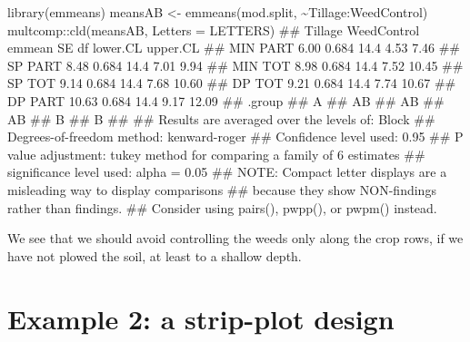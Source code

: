 \documentclass[a4paper,12pt,oneside]{book}
\newenvironment{Shaded}{\begin{snugshade}}{\end{snugshade}}
\newcommand{\SpecialCharTok}[1]{#1}
\newcommand{\DocumentationTok}[1]{#1}
\newcommand{\OtherTok}[1]{#1}
\newcommand{\FunctionTok}[1]{#1}
\newcommand{\AttributeTok}[1]{#1}
\newcommand{\AlertTok}[1]{#1}
\newcommand{\NormalTok}[1]{#1}
\begin{document}
\begin{Shaded}
\begin{Highlighting}[]
\FunctionTok{library}\NormalTok{(emmeans)}
\NormalTok{meansAB }\OtherTok{\textless{}{-}} \FunctionTok{emmeans}\NormalTok{(mod.split, }\SpecialCharTok{\textasciitilde{}}\NormalTok{Tillage}\SpecialCharTok{:}\NormalTok{WeedControl)}
\NormalTok{multcomp}\SpecialCharTok{::}\FunctionTok{cld}\NormalTok{(meansAB, }\AttributeTok{Letters =}\NormalTok{ LETTERS)}
\DocumentationTok{\#\#  Tillage WeedControl emmean    SE   df lower.CL upper.CL}
\DocumentationTok{\#\#  MIN     PART          6.00 0.684 14.4     4.53     7.46}
\DocumentationTok{\#\#  SP      PART          8.48 0.684 14.4     7.01     9.94}
\DocumentationTok{\#\#  MIN     TOT           8.98 0.684 14.4     7.52    10.45}
\DocumentationTok{\#\#  SP      TOT           9.14 0.684 14.4     7.68    10.60}
\DocumentationTok{\#\#  DP      TOT           9.21 0.684 14.4     7.74    10.67}
\DocumentationTok{\#\#  DP      PART         10.63 0.684 14.4     9.17    12.09}
\DocumentationTok{\#\#  .group}
\DocumentationTok{\#\#   A    }
\DocumentationTok{\#\#   AB   }
\DocumentationTok{\#\#   AB   }
\DocumentationTok{\#\#   AB   }
\DocumentationTok{\#\#    B   }
\DocumentationTok{\#\#    B   }
\DocumentationTok{\#\# }
\DocumentationTok{\#\# Results are averaged over the levels of: Block }
\DocumentationTok{\#\# Degrees{-}of{-}freedom method: kenward{-}roger }
\DocumentationTok{\#\# Confidence level used: 0.95 }
\DocumentationTok{\#\# P value adjustment: tukey method for comparing a family of 6 estimates }
\DocumentationTok{\#\# significance level used: alpha = 0.05 }
\DocumentationTok{\#\# }\AlertTok{NOTE}\DocumentationTok{: Compact letter displays are a misleading way to display comparisons}
\DocumentationTok{\#\#       because they show NON{-}findings rather than findings.}
\DocumentationTok{\#\#       Consider using \textquotesingle{}pairs()\textquotesingle{}, \textquotesingle{}pwpp()\textquotesingle{}, or \textquotesingle{}pwpm()\textquotesingle{} instead.}
\end{Highlighting}
\end{Shaded}

We see that we should avoid controlling the weeds only along the crop rows, if we have not plowed the soil, at least to a shallow depth.

\hypertarget{example-2-a-strip-plot-design}{%
\section{Example 2: a strip-plot design}\label{example-2-a-strip-plot-design}}
\end{document}
